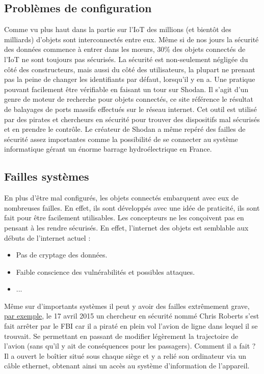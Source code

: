\documentclass[a4paper]{report}
\begin{document}
	\subsection{Problèmes de configuration}
	Comme vu plus haut dans la partie sur l'IoT des millions (et bientôt des milliards) d'objets sont interconnectés entre eux. Même si
	de nos jours la sécurité des données commence à entrer dans les mœurs, 30\% des objets connectés de l'IoT ne sont toujours pas sécurisés.
	La sécurité est non-seulement négligée du côté des constructeurs, mais aussi du côté des utilisateurs, la plupart ne prenant pas la
	peine de changer les identifiants par défaut, lorsqu'il y en a. Une pratique pouvant facilement être vérifiable en faisant un tour sur 
	Shodan. Il s'agit d'un genre de moteur de recherche pour objets connectés, ce site référence le résultat de balayages de ports massifs
	effectués sur le réseau internet. Cet outil est utilisé par des pirates et chercheurs en sécurité pour trouver des dispositifs mal
	sécurisés et en prendre le contrôle. Le créateur de Shodan a même repéré des failles de sécurité assez importantes comme la possibilité
	de se connecter au système informatique gérant un énorme barrage hydroélectrique en France.
	
	\subsection{Failles systèmes}
	En plus d'être mal configurés, les objets connectés embarquent avec eux de nombreuses failles. En effet, ils sont développés avec
	une idée de praticité, ils sont fait pour être facilement utilisables. Les concepteurs ne les conçoivent pas en pensant à les rendre
	sécurisés. En effet, l'internet des objets est semblable aux débuts de l'internet actuel :
	\medbreak
	\begin{itemize}
		\item Pas de cryptage des données.
		\item Faible conscience des vulnérabilités et possibles attaques.
		\item ...
	\end{itemize}
	\smallbreak
	Même sur d'importants systèmes il peut y avoir des failles extrêmement grave, 
	\href{https://www.objetconnecte.com/les-objets-connectes-un-risque-de-cybersecurite-majeur-dans-lentreprise-2310/}{par exemple}, 
	le 17 avril 2015 un chercheur en sécurité nommé Chris Roberts s'est fait arrêter par le FBI car il a piraté en plein vol l'avion
	de ligne dans lequel il se trouvait. Se permettant en passant de modifier légèrement la trajectoire de l'avion (sans qu'il y ait
	de conséquences pour les passagers). Comment il a fait ? Il a ouvert le boîtier situé sous chaque siège et y a relié son ordinateur via
	un câble ethernet, obtenant ainsi un accès au système d'information de l'appareil.\\
	
\end{document}

